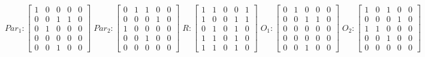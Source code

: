      $$
        Par_{1} : \begin{bmatrix}
            1 & 0 & 0 & 0 & 0 \\
            0 & 0 & 1 & 1 & 0 \\
            0 & 1 & 0 & 0 & 0 \\
			0 & 0 & 0 & 0 & 0 \\
            0 & 0 & 1 & 0 & 0 
        \end{bmatrix}
        \;
        Par_{2} : \begin{bmatrix}
            0 & 1 & 1 & 0 & 0 \\
            0 & 0 & 0 & 1 & 0 \\
            1 & 0 & 0 & 0 & 0 \\
            0 & 0 & 1 & 0 & 0 \\
            0 & 0 & 0 & 0 & 0
        \end{bmatrix}
        \;
        R : \begin{bmatrix}
            1 & 1 & 0 & 0 & 1 \\
            1 & 0 & 0 & 1 & 1 \\
            0 & 1 & 0 & 1 & 0 \\
            1 & 1 & 0 & 1 & 0 \\
            1 & 1 & 0 & 1 & 0
        \end{bmatrix}
        \;
        O_{1} : \begin{bmatrix}
            0 & 1 & 0 & 0 & 0 \\
            0 & 0 & 1 & 1 & 0 \\
            0 & 0 & 0 & 0 & 0 \\
            0 & 0 & 0 & 0 & 0 \\
            0 & 0 & 1 & 0 & 0
        \end{bmatrix}
        \;
        O_{2} : \begin{bmatrix}
            1 & 0 & 1 & 0 & 0 \\
            0 & 0 & 0 & 1 & 0 \\
            1 & 1 & 0 & 0 & 0 \\
            0 & 0 & 1 & 0 & 0 \\
            0 & 0 & 0 & 0 & 0
        \end{bmatrix}
    $$ 
